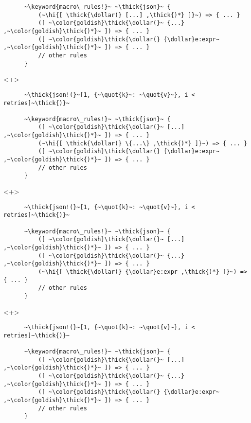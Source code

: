 \documentclass[usepdftitle=false]{beamer}
\newcommand{\dollar}{\makebox[\widthof{\$}][c]{\$}}
\newcommand{\thick}[1]{\contourlength{0.16pt}\contour[10]{black}{#1}}
\newcommand{\slantbox}[2][.5]
  {%
    \mbox
      {%
        \sbox{\foobox}{#2}%
        \hskip\wd\foobox
        \pdfsave
        \pdfsetmatrix{1 0 #1 1}%
        \llap{\usebox{\foobox}}%
        \pdfrestore
      }%
  }
\newcommand{\backslantbox}[2][.5]
  {%
    \mbox
      {%
        \sbox{\foobox}{#2}%
        \hskip\wd\foobox
        \pdfsave
        \pdfsetmatrix{-1 0 #1 1}%
        \llap{\usebox{\foobox}}%
        \pdfrestore
      }%
  }
\newcommand{\hi}[1]{%
\tikz[baseline=(A.base)]
 \node[highlighting=yellowbg,inner sep=0pt,text depth=0pt] (A) {#1};%
}
\newcommand{\openquote}{\backslantbox[.2]{\hspace{11pt}''\hspace{-11pt}}}
\newcommand{\closequote}{\slantbox[-.2]{\hspace{2pt}''\hspace{-2pt}}}
\newcommand{\blackquote}[1]{\openquote#1\closequote}
\newcommand{\quot}[1]{{\color{redish}\blackquote{#1}}}
\newcommand{\keyword}[1]{\color{greenish}#1}
\begin{document}
\begin{frame}[fragile]
\begin{onlyenv}
\begin{verbatim}
      ~\keyword{macro\_rules!}~ ~\thick{json}~ {
          (~\hi{[ \thick{\dollar(} [...] ,\thick{)*} ]}~) => { ... }
          ([ ~\color{goldish}\thick{\dollar(}~ {...} ,~\color{goldish}\thick{)*}~ ]) => { ... }
          ([ ~\color{goldish}\thick{\dollar(} {\dollar}e:expr~ ,~\color{goldish}\thick{)*}~ ]) => { ... }
          // other rules
      }
    \end{verbatim}
  \end{onlyenv}
  \begin{onlyenv}<+>
    \begin{verbatim}
      ~\thick{json!(}~[1, {~\quot{k}~: ~\quot{v}~}, i < retries]~\thick{)}~

      ~\keyword{macro\_rules!}~ ~\thick{json}~ {
          ([ ~\color{goldish}\thick{\dollar(}~ [...] ,~\color{goldish}\thick{)*}~ ]) => { ... }
          (~\hi{[ \thick{\dollar(} \{...\} ,\thick{)*} ]}~) => { ... }
          ([ ~\color{goldish}\thick{\dollar(} {\dollar}e:expr~ ,~\color{goldish}\thick{)*}~ ]) => { ... }
          // other rules
      }
    \end{verbatim}
  \end{onlyenv}
  \begin{onlyenv}<+>
    \begin{verbatim}
      ~\thick{json!(}~[1, {~\quot{k}~: ~\quot{v}~}, i < retries]~\thick{)}~

      ~\keyword{macro\_rules!}~ ~\thick{json}~ {
          ([ ~\color{goldish}\thick{\dollar(}~ [...] ,~\color{goldish}\thick{)*}~ ]) => { ... }
          ([ ~\color{goldish}\thick{\dollar(}~ {...} ,~\color{goldish}\thick{)*}~ ]) => { ... }
          (~\hi{[ \thick{\dollar(} {\dollar}e:expr ,\thick{)*} ]}~) => { ... }
          // other rules
      }
    \end{verbatim}
  \end{onlyenv}
  \begin{onlyenv}<+>
    \begin{verbatim}
      ~\thick{json!(}~[1, {~\quot{k}~: ~\quot{v}~}, i < retries]~\thick{)}~

      ~\keyword{macro\_rules!}~ ~\thick{json}~ {
          ([ ~\color{goldish}\thick{\dollar(}~ [...] ,~\color{goldish}\thick{)*}~ ]) => { ... }
          ([ ~\color{goldish}\thick{\dollar(}~ {...} ,~\color{goldish}\thick{)*}~ ]) => { ... }
          ([ ~\color{goldish}\thick{\dollar(} {\dollar}e:expr~ ,~\color{goldish}\thick{)*}~ ]) => { ... }
          // other rules
      }
    \end{verbatim}
  \end{onlyenv}
\end{frame}
\end{document}
